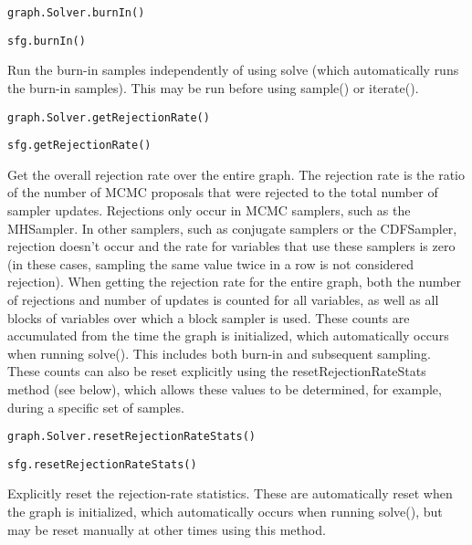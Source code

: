 \ifmatlab
\begin{lstlisting}
graph.Solver.burnIn()
\end{lstlisting}
\fi

\ifjava
\begin{lstlisting}
sfg.burnIn()
\end{lstlisting}
\fi

Run the burn-in samples independently of using solve (which automatically runs the burn-in samples).  This may be run before using sample() or iterate().

\ifmatlab
\begin{lstlisting}
graph.Solver.getRejectionRate()
\end{lstlisting}
\fi

\ifjava
\begin{lstlisting}
sfg.getRejectionRate()
\end{lstlisting}
\fi

Get the overall rejection rate over the entire graph.  The rejection rate is the ratio of the number of MCMC proposals that were rejected to the total number of sampler updates.  Rejections only occur in MCMC samplers, such as the MHSampler.  In other samplers, such as conjugate samplers or the CDFSampler, rejection doesn't occur and the rate for variables that use these samplers is zero (in these cases, sampling the same value twice in a row is not considered rejection).  When getting the rejection rate for the entire graph, both the number of rejections and number of updates is counted for all variables, as well as all blocks of variables over which a block sampler is used.  These counts are accumulated from the time the graph is initialized, which automatically occurs when running solve().  This includes both burn-in and subsequent sampling.  These counts can also be reset explicitly using the resetRejectionRateStats method (see below), which allows these values to be determined, for example, during a specific set of samples.

\ifmatlab
\begin{lstlisting}
graph.Solver.resetRejectionRateStats()
\end{lstlisting}
\fi

\ifjava
\begin{lstlisting}
sfg.resetRejectionRateStats()
\end{lstlisting}
\fi

Explicitly reset the rejection-rate statistics.  These are automatically reset when the graph is initialized, which automatically occurs when running solve(), but may be reset manually at other times using this method.


